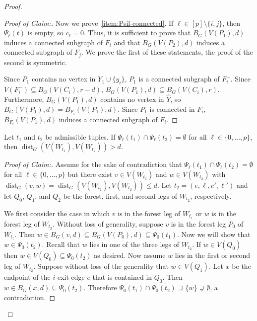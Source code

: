 \documentclass{patmorin}
\newcommand{\pat}[1]{\textcolor{Blue}{[Pat: #1]}}
\newenvironment{clmproof}{\begin{proof}[Proof of Claim:]\renewcommand{\qedsymbol}{\rule{1ex}{1ex}}}{\end{proof}}
\DeclareMathOperator{\dist}{dist}
\begin{document}
\begin{proof}
\begin{clmproof}
    Now we prove~\cref{item:Psil-connected}. If $\ell\in [p]\setminus\{i,j\}$, then $\Psi_\ell(t)$ is empty, so $c_\ell=0$.
    Thus, it is sufficient to prove that $B_G(V(P_1), d)$ induces a connected subgraph of $F_i$ and that $B_G(V(P_2),d)$ induces a connected subgraph of $F_j$.  We prove the first of these statements, the proof of the second is symmetric.

    Since $P_1$ contains no vertex in $Y_1\cup\{y_i\}$, $P_1$ is a connected
    subgraph of $F_i^-$.  Since $V(F^-_i)\subseteq B_G(V(C_i),r-d)$, $B_G(V(P_1),d)\subseteq B_G(V(C_i),r)$.  Furthermore, $B_G(V(P_1),d)$ contains no vertex in $\widehat{Y}$, so $B_G(V(P_1),d)=B_{F_i}(V(P_1),d)$.
    Since $P_1$ is connected in $F_i$,
    $B_{F_i}(V(P_1),d)$ induces a connected subgraph of $F_i$.
\end{clmproof}

\begin{clm}\label{w_distance}
  Let $t_1$ and $t_2$ be admissible tuples.
  If $\Psi_\ell(t_1)\cap \Psi_\ell(t_2)=\emptyset$ for all $\ell\in\{0,\ldots,p\}$,
  then $\dist_G(V(W_{t_1}),V(W_{t_2}))> d$.
\end{clm}



\begin{clmproof}
  Assume for the sake of contradiction that $\Psi_\ell(t_1)\cap\Psi_\ell(t_2)=\emptyset$ for all $\ell\in\{0,\ldots,p\}$ but there exist $v\in V(W_{t_1})$ and $w\in V(W_{t_2})$ with $\dist_G(v,w)=\dist_G(V(W_{t_1}),V(W_{t_2})) \le d$.  Let $t_2=(e,\ell,e',\ell')$ and let $Q_0$, $Q_1$, and $Q_2$ be the forest, first, and second legs of $W_{t_2}$, respectively.

  We first consider the case in which $v$ is in the forest leg of $W_{t_1}$ or $w$ is in the forest leg of $W_{t_2}$.   Without loss of generality, suppose $v$ is in the forest leg $P_0$ of $W_{t_1}$.
  Then $w\in B_G(v,d)\subseteq B_G(V(P_0),d)\subseteq\Psi_0(t_1)$.  Now we will show that $w\in \Psi_0(t_2)$.   Recall that $w$ lies in one of the three legs of $W_{t_2}$.
  If $w\in V(Q_0)$ then $w\in V(Q_0)\subseteq \Psi_0(t_2)$ as desired.
  Now assume $w$ lies in the first or second leg of $W_{t_2}$.
  Suppose without loss of the generality that $w\in V(Q_1)$.
  Let $x$ be the endpoint of the $i$-exit edge $e$ that is contained in $Q_0$.
  Then $w\in B_G(x,d)\subseteq\Psi_0(t_2)$.
  Therefore $\Psi_0(t_1)\cap\Psi_0(t_2)\supseteq\{w\}\supsetneq\emptyset$, a contradiction.


\end{clmproof}
\end{proof}
\end{document}
